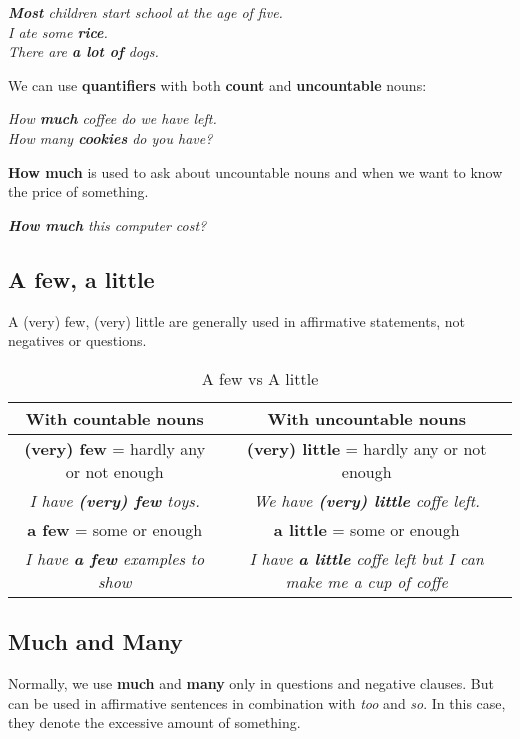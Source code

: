 \documentclass[10pt,a4paper]{article}
\begin{document}
\begin{center}
	\textit{ \textbf{Most} children start school at the age of five. \\
		I ate some \textbf{rice}. \\
		There are \textbf{a lot of} dogs. }
\end{center}

We can use \textbf{quantifiers} with both \textbf{count} and \textbf{uncountable} nouns:
 \begin{center}
 	\textit{How \textbf{much} coffee do we have left. \\
	 		How many \textbf{cookies}  do you have?}
 \end{center}

\textbf{How much} is used to ask about uncountable nouns and when we want to know the price of something.
\begin{center}
	\textit{ \textbf{How much} this computer cost? }
\end{center}

\subsection{A few, a little}
A (very) few, (very) little are generally used in affirmative statements, not negatives or questions.
\begin{table}[h]
	\begin{center}
	\begin{tabular}{|c|c|}
		\hline
		\textbf{With countable nouns} & \textbf{With uncountable nouns} \\ \hline
		\textbf{(very) few} = hardly any or not enough & \textbf{(very) little} = hardly any or not enough \\ \hline
		\textit{I have \textbf{(very) few} toys.} & \textit{We have \textbf{(very) little} coffe left. } \\ \hline
		\textbf{a few} = some or enough & \textbf{a little} = some or enough \\ \hline
		\textit{I have \textbf{a few} examples to show } & \textit{I have \textbf{a little} coffe left but I can make me a cup of coffe } \\ \hline
	\end{tabular}
\end{center}
\caption{\label{tab:quantifiers1}A few vs A little}
\end{table}

\subsection{Much and Many}
Normally, we use \textbf{much} and \textbf{many} only in questions and negative clauses. But can be used in affirmative sentences in combination with \textit{too} and \textit{so}. In this case, they denote the excessive amount of something.
\end{document}
